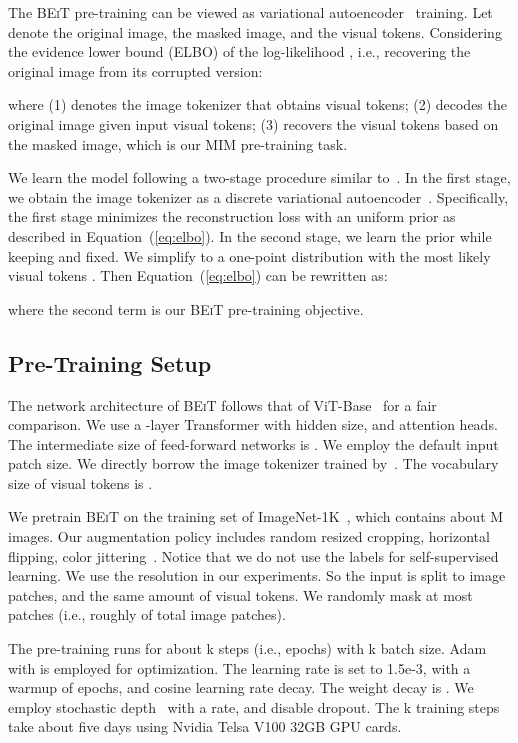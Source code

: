 \documentclass{article}
\newcommand\our{\textsc{BEiT}}
\begin{document}
The \our{} pre-training can be viewed as variational autoencoder~\citep{vae} training.
Let  denote the original image,  the masked image, and  the visual tokens.
Considering the evidence lower bound (ELBO) of the log-likelihood , i.e., recovering the original image from its corrupted version:

where (1)  denotes the image tokenizer that obtains visual tokens; (2)  decodes the original image given input visual tokens; (3)  recovers the visual tokens based on the masked image, which is our MIM pre-training task.

We learn the model following a two-stage procedure similar to~\citep{vqvae,vqvae2}.
In the first stage, we obtain the image tokenizer as a discrete variational autoencoder~\citep{dalle}.
Specifically, the first stage minimizes the reconstruction loss  with an uniform prior as described in Equation~(\ref{eq:elbo}).
In the second stage, we learn the prior  while keeping  and  fixed.
We simplify  to a one-point distribution with the most likely visual tokens .
Then Equation~(\ref{eq:elbo}) can be rewritten as:

where the second term is our \our{} pre-training objective.


\subsection{Pre-Training Setup}
\label{sec:pt:setup}

The network architecture of \our{} follows that of ViT-Base~\citep{vit} for a fair comparison.
We use a -layer Transformer with  hidden size, and  attention heads. The intermediate size of feed-forward networks is .
We employ the default  input patch size.
We directly borrow the image tokenizer trained by~\citep{dalle}. The vocabulary size of visual tokens is .


We pretrain \our{} on the training set of ImageNet-1K~\citep{imagenet}, which contains about M images.
Our augmentation policy includes random resized cropping, horizontal flipping, color jittering~\citep{wu2018unsupervised}.
Notice that we do not use the labels for self-supervised learning.
We use the  resolution in our experiments.
So the input is split to  image patches, and the same amount of visual tokens.
We randomly mask at most  patches (i.e., roughly  of total image patches).

The pre-training runs for about k steps (i.e.,  epochs) with k batch size.
Adam~\citep{adamw} with  is employed for optimization. The learning rate is set to 1.5e-3, with a warmup of  epochs, and cosine learning rate decay.
The weight decay is .
We employ stochastic depth~\citep{stochastic:depth} with a  rate, and disable dropout.
The k training steps take about five days using  Nvidia Telsa V100 32GB GPU cards.
\end{document}
